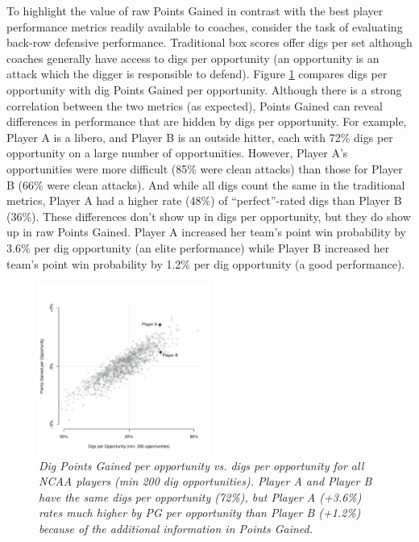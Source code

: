 \documentclass{article}
\begin{document}
To highlight the value of raw Points Gained in contrast with the best player performance metrics readily available to coaches, consider the task of evaluating back-row defensive performance. Traditional box scores offer digs per set although coaches generally have access to digs per opportunity (an opportunity is an attack which the digger is responsible to defend). Figure \ref{fig:dig-comparison} compares digs per opportunity with dig Points Gained per opportunity. Although there is a strong correlation between the two metrics (as expected), Points Gained can reveal differences in performance that are hidden by digs per opportunity. For example, Player A is a libero, and Player B is an outside hitter, each with 72\% digs per opportunity on a large number of opportunities. However, Player A's opportunities were more difficult (85\% were clean attacks) than those for Player B (66\% were clean attacks). And while all digs count the same in the traditional metrics, Player A had a higher rate (48\%) of ``perfect''-rated digs than Player B (36\%). These differences don't show up in digs per opportunity, but they do show up in raw Points Gained. Player A increased her team's point win probability by 3.6\% per dig opportunity (an elite performance) while Player B increased her team's point win probability by 1.2\% per dig opportunity (a good performance).

\begin{figure}
    \centering
    \includegraphics[width=0.5\textwidth]{figures/dig_comparison.pdf}
    \caption{\it Dig Points Gained per opportunity vs. digs per opportunity for all NCAA players (min 200 dig opportunities). Player A and Player B have the same digs per opportunity (72\%), but Player A (+3.6\%) rates much higher by PG per opportunity than Player B (+1.2\%) because of the additional information in Points Gained.}
    \label{fig:dig-comparison}
\end{figure}
\end{document}

